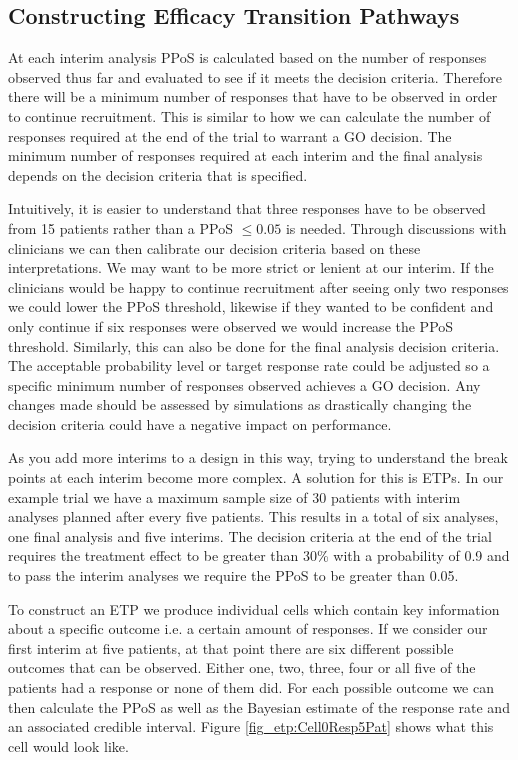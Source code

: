 \subsection{Constructing Efficacy Transition Pathways} 
\label{etp:conETPs}

At each interim analysis PPoS is calculated based on the number of responses observed thus far and evaluated to see if it meets the decision criteria. Therefore there will be a minimum number of responses that have to be observed in order to continue recruitment. This is similar to how we can calculate the number of responses required at the end of the trial to warrant a GO decision. The minimum number of responses required at each interim and the final analysis depends on the decision criteria that is specified. 

Intuitively, it is easier to understand that three responses have to be observed from 15 patients rather than a PPoS $\leq 0.05$ is needed. Through discussions with clinicians we can then calibrate our decision criteria based on these interpretations. We may want to be more strict or lenient at our interim. If the clinicians would be happy to continue recruitment after seeing only two responses we could lower the PPoS threshold, likewise if they wanted to be confident and only continue if six responses were observed we would increase the PPoS threshold. Similarly, this can also be done for the final analysis decision criteria. The acceptable probability level or target response rate could be adjusted so a specific minimum number of responses observed achieves a GO decision. Any changes made should be assessed by simulations as drastically changing the decision criteria could have a negative impact on performance. 
 
As you add more interims to a design in this way, trying to understand the break points at each interim become more complex. A solution for this is ETPs. In our example trial we have a maximum sample size of 30 patients with interim analyses planned after every five patients. This results in a total of six analyses, one final analysis and five interims. The decision criteria at the end of the trial requires the treatment effect to be greater than 30\% with a probability of 0.9 and to pass the interim analyses we require the PPoS to be greater than 0.05. 

To construct an ETP we produce individual cells which contain key information about a specific outcome i.e. a certain amount of responses. If we consider our first interim at five patients, at that point there are six different possible outcomes that can be observed. Either one, two, three, four or all five of the patients had a response or none of them did. For each possible outcome we can then calculate the PPoS as well as the Bayesian estimate of the response rate and an associated credible interval. Figure \ref{fig_etp:Cell0Resp5Pat} shows what this cell would look like. 

